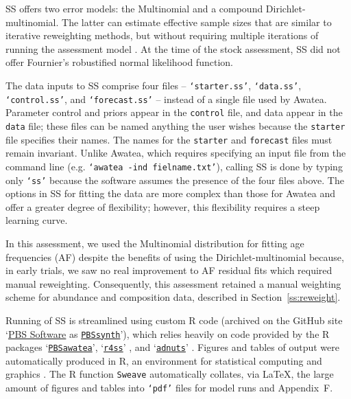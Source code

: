 \documentclass[11pt]{book}
\newcommand{\code}[1]{\normalsize\texttt{#1}\normalsize}%
\newcommand{\AppRes}{Appendix~F}
\begin{document}
SS offers two error models: the Multinomial and a compound Dirichlet-multinomial.
The latter can estimate effective sample sizes that are similar to iterative reweighting methods, but without requiring multiple iterations of running the assessment model \citep{Thorson-etal:2017}.
At the time of the stock assessment, SS did not offer Fournier's robustified normal likelihood function.

The data inputs to SS comprise four files -- \code{`starter.ss'}, \code{`data.ss'}, \code{`control.ss'}, and \code{`forecast.ss'} -- instead of a single file used by Awatea.
Parameter control and priors appear in the \code{control} file, and data appear in the \code{data} file; these files can be named anything the user wishes because the \code{starter} file specifies their names.
The names for the \code{starter} and \code{forecast} files must remain invariant.
Unlike Awatea, which requires specifying an input file from the command line (e.g. \code{`awatea -ind fielname.txt'}), calling SS is done by typing only \code{`ss'} because the software assumes the presence of the four files above.
The options in SS for fitting the data are more complex than those for Awatea and offer a greater degree of flexibility; however, this flexibility requires a steep learning curve.

In this assessment, we used the Multinomial distribution for fitting age frequencies (AF) despite the benefits of using the Dirichlet-multinomial because, in early trials, we saw no real improvement to AF residual fits which required manual reweighting.
Consequently, this assessment retained a manual weighting scheme for abundance and composition data, described in Section~\ref{ss:reweight}.

Running of SS is streamlined using custom R code (archived on the GitHub site `\href{https://github.com/pbs-software}{PBS Software} as \href{https://github.com/pbs-software/pbs-synth}{\code{PBSsynth}}'), which relies heavily on code provided by the R packages `\href{https://github.com/pbs-software/pbs-awatea}{\code{PBSawatea}}', `\href{https://github.com/r4ss/r4ss}{\code{r4ss}}' \citep{R:2020_r4ss}, and `\href{https://github.com/Cole-Monnahan-NOAA/adnuts}{\code{adnuts}}' \citep{R:2018_adnuts}.
Figures and tables of output were automatically produced in R, an environment for statistical computing and graphics \citep{R:2021_base}. 
The R function \code{Sweave} \citep{Leisch:2002} automatically collates, via \LaTeX, the large amount of figures and tables into \code{`pdf'} files for model runs and \AppRes.
\end{document}
